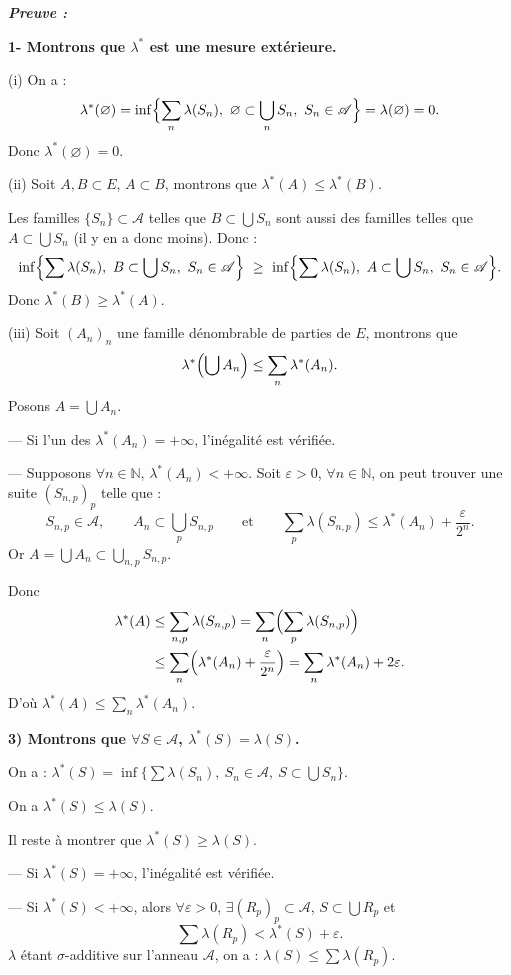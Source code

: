\documentclass[11pt,a4paper]{article}
\newcommand{\N}{\mathbb{N}}
\newcommand{\A}{\mathscr{A}}
\newenvironment{preuve}{\par\textit{\textbf{Preuve :}}\par\nopagebreak[4]}{\par}
\begin{document}
\begin{preuve}
\textbf{1- Montrons que $\lambda^*$ est une mesure extérieure.}

(i) On a :
\[
  \lambda^*(\varnothing)=\inf\Bigl\{\sum_n\lambda(S_n),\ \varnothing\subset\bigcup_nS_n,\ S_n\in\A\Bigr\}=\lambda(\varnothing)=0 .
\]
Donc $\lambda^*(\varnothing)=0$.

(ii) Soit $A,B\subset E$, $A\subset B$, montrons que $\lambda^*(A)\le\lambda^*(B)$.

Les familles $\{S_n\}\subset\A$ telles que $B\subset\bigcup S_n$ sont aussi des familles telles que $A\subset\bigcup S_n$ (il y en a donc moins).
Donc :
\[
  \inf\Bigl\{\sum\lambda(S_n),\ B\subset\bigcup S_n,\ S_n\in\A\Bigr\}\ \ge\
  \inf\Bigl\{\sum\lambda(S_n),\ A\subset\bigcup S_n,\ S_n\in\A\Bigr\}.
\]
Donc $\lambda^*(B)\ge\lambda^*(A)$.

(iii) Soit $(A_n)_n$ une famille dénombrable de parties de $E$, montrons que
\[
  \lambda^*\Bigl(\bigcup A_n\Bigr)\le\sum_n\lambda^*(A_n).
\]
Posons $A=\bigcup A_n$.

--- Si l'un des $\lambda^*(A_n)=+\infty$, l'inégalité est vérifiée.

--- Supposons $\forall n\in\N$, $\lambda^*(A_n)<+\infty$. Soit $\varepsilon>0$, $\forall n\in\N$, on peut trouver une suite $(S_{n,p})_p$ telle que :
\[
  S_{n,p}\in\A,\qquad A_n\subset\bigcup_pS_{n,p}\qquad\text{et}\qquad\sum_p\lambda(S_{n,p})\le\lambda^*(A_n)+\frac{\varepsilon}{2^n}.
\]
Or $A=\bigcup A_n\subset\displaystyle\bigcup_{n,p}S_{n,p}$.

Donc
\begin{align*}
  \lambda^*(A)&\le\sum_{n,p}\lambda(S_{n,p})=\sum_n\Bigl(\sum_p\lambda(S_{n,p})\Bigr)\\
  &\le\sum_n\Bigl(\lambda^*(A_n)+\frac{\varepsilon}{2^n}\Bigr)=\sum_n\lambda^*(A_n)+2\varepsilon .
\end{align*}
D'où $\displaystyle\lambda^*(A)\le\sum_n\lambda^*(A_n)$.

\medskip
\textbf{3) Montrons que $\forall S\in\A$, $\lambda^*(S)=\lambda(S)$.}

On a : $\lambda^*(S)=\inf\bigl\{\sum\lambda(S_n),\ S_n\in\A,\ S\subset\bigcup S_n\bigr\}$.

On a $\lambda^*(S)\le\lambda(S)$.

Il reste à montrer que $\lambda^*(S)\ge\lambda(S)$.

--- Si $\lambda^*(S)=+\infty$, l'inégalité est vérifiée.

--- Si $\lambda^*(S)<+\infty$, alors $\forall\varepsilon>0$, $\exists(R_p)_p\subset\A$, $S\subset\bigcup R_p$ et
\[
  \sum\lambda(R_p)<\lambda^*(S)+\varepsilon .
\]
$\lambda$ étant $\sigma$-additive sur l'anneau $\A$, on a : $\lambda(S)\le\sum\lambda(R_p)$.


\end{preuve}
\end{document}
